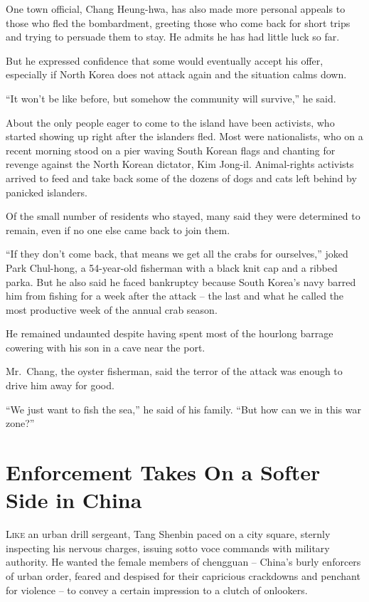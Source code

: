 ﻿\documentclass[12pt]{article}
\begin{document}
One town official, Chang Heung-hwa, has also made more personal appeals to those who fled the
bombardment, greeting those who come back for short trips and trying to persuade them to stay. He
admits he has had little luck so far.

But he expressed confidence that some would eventually accept his offer, especially if North Korea
does not attack again and the situation calms down.

``It won't be like before, but somehow the community will survive,'' he said.

About the only people eager to come to the island have been activists, who started showing up right
after the islanders fled. Most were nationalists, who on a recent morning stood on a pier waving
South Korean flags and chanting for revenge against the North Korean dictator, Kim Jong-il.
Animal-rights activists arrived to feed and take back some of the dozens of dogs and cats left
behind by panicked islanders.

Of the small number of residents who stayed, many said they were determined to remain, even if no
one else came back to join them.

``If they don't come back, that means we get all the crabs for ourselves,'' joked Park Chul-hong, a
54-year-old fisherman with a black knit cap and a ribbed parka. But he also said he faced bankruptcy
because South Korea's navy barred him from fishing for a week after the attack -- the last and what
he called the most productive week of the annual crab season.

He remained undaunted despite having spent most of the hourlong barrage cowering with his son in a
cave near the port.

Mr.~Chang, the oyster fisherman, said the terror of the attack was enough to drive him away for
good.

``We just want to fish the sea,'' he said of his family. ``But how can we in this war zone?''

\section{Enforcement Takes On a Softer Side in China}

\lettrine{L}{ike} an urban drill sergeant, Tang Shenbin paced on a city
square, sternly inspecting his nervous charges, issuing sotto voce commands with military authority.
He wanted the female members of chengguan -- China's burly enforcers of urban order, feared and
despised for their capricious crackdowns and penchant for violence -- to convey a certain impression
to a clutch of onlookers.
\end{document}
